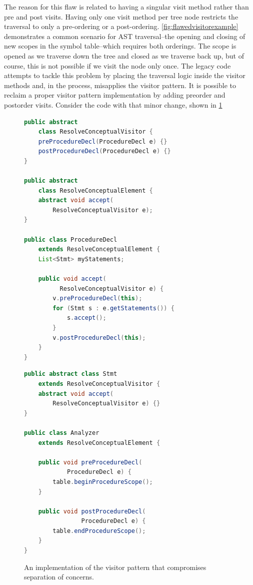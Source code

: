 \documentclass[times]{speauth}
\begin{document}
The reason for this flaw is related to having a singular visit method rather than pre and post visits. Having only one visit method per tree node restricts the traversal to only a pre-ordering or a post-ordering. \ref{fig:flawedvisitorexample} demonstrates a common scenario for AST traversal--the opening and closing of new scopes in the symbol table--which requires both orderings. The scope is opened as we traverse down the tree and closed as we traverse back up, but of course, this is not possible if we visit the node only once. The legacy code attempts to tackle this problem by placing the traversal logic inside the visitor methods and, in the process, misapplies the visitor pattern. It is possible to reclaim a proper visitor pattern implementation by adding preorder and postorder visits. Consider the code with that minor change, shown in \ref{fig:fixedvisitorexample}

\begin{figure}[!htb]
\centering
\begin{minipage}{.45\textwidth}
\begin{lstlisting}[language=java]
public abstract
	class ResolveConceptualVisitor {
    preProcedureDecl(ProcedureDecl e) {}
    postProcedureDecl(ProcedureDecl e) {}
}

public abstract
	class ResolveConceptualElement {
    abstract void accept(
        ResolveConceptualVisitor e);
}

public class ProcedureDecl
	extends ResolveConceptualElement {	
    List<Stmt> myStatements;

    public void accept(
    	  ResolveConceptualVisitor e) {
        v.preProcedureDecl(this);
        for (Stmt s : e.getStatements()) {
            s.accept();
        }
        v.postProcedureDecl(this);
    }
}
\end{lstlisting}
\end{minipage}\quad
\begin{minipage}{.45\textwidth}
\begin{lstlisting}[language=java]
public abstract class Stmt
	extends ResolveConceptualVisitor {
    abstract void accept(
    	ResolveConceptualVisitor e) {}
}

public class Analyzer
	extends ResolveConceptualElement {
	
    public void preProcedureDecl(
  			ProcedureDecl e) {
        table.beginProcedureScope();
    }

    public void postProcedureDecl(
    			ProcedureDecl e) {
        table.endProcedureScope();
    }
}
\end{lstlisting}
\end{minipage}
\caption{An implementation of the visitor pattern that compromises separation of concerns.}
\label{fig:fixedvisitorexample}
\end{figure}
\end{document}

